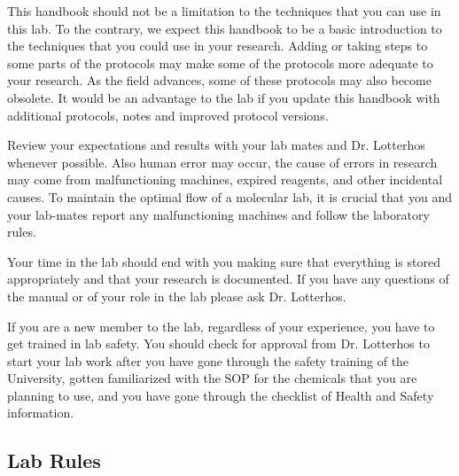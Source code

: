 \documentclass[11pt, oneside]{article}
\begin{document}
	This handbook should not be a limitation to the techniques that you can use in this lab. To the contrary, we expect this handbook to be a basic 			introduction to the techniques that you could use in your research. Adding or taking steps to some parts of the protocols may make some of the 		protocols more adequate to your research. As the field advances, some of these protocols may also become obsolete.  It would be an advantage to 		the lab if you update this handbook with additional protocols, notes and improved protocol versions. 

	Review your expectations and results with your lab mates and Dr. Lotterhos whenever possible. Also human error may occur, the cause of errors in 		research may come from malfunctioning machines, expired reagents, and other incidental causes. To maintain the optimal flow of a molecular lab, it is 	crucial that you and your lab-mates report any malfunctioning machines and follow the laboratory rules.  

	Your time in the lab should end with you making sure that everything is stored appropriately and that your research is documented. If you have any 		questions of the manual or of your role in the lab please ask Dr. Lotterhos.

	If you are a new member to the lab, regardless of your experience, you have to get trained in lab safety. You should check for approval from Dr. 		Lotterhos to start your lab work after you have gone through the safety training of the University, gotten familiarized with the SOP for the chemicals 		that you are planning to use, and you have gone through the checklist of Health and Safety information. 

	\newpage

	\subsection{Lab Rules}
\end{document}
